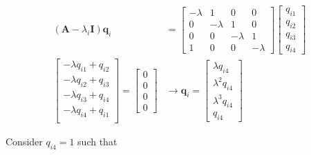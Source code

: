 \begin{align*}
(\mathbf{A} - \lambda_i \mathbf{I})\mathbf{q}_i &= \begin{bmatrix}
                                                    -\lambda & 1 & 0 & 0\\
                                                    0 & -\lambda & 1 & 0\\
                                                    0 & 0 & -\lambda & 1\\
                                                    1 & 0 & 0 & -\lambda
                                                   \end{bmatrix}
                                                   \begin{bmatrix}
                                                    q_{i1}\\
                                                    q_{i2}\\
                                                    q_{i3}\\
                                                    q_{i4}
                                                   \end{bmatrix}\\
\begin{bmatrix}
 -\lambda q_{i1} + q_{i2}\\
 -\lambda q_{i2}+ q_{i3}\\
 -\lambda q_{i3}+ q_{i4}\\
 -\lambda q_{i4}+ q_{i1}\\
\end{bmatrix} =
\begin{bmatrix}
 0\\0\\0\\0
\end{bmatrix}
& \rightarrow
\mathbf{q}_i = \begin{bmatrix}
                \lambda q_{i4} \\ \lambda^2 q_{i4} \\ \lambda^3 q_{i4} \\q_{i4}
               \end{bmatrix}
\end{align*}
%

Consider $q_{i4} = 1$ such that

